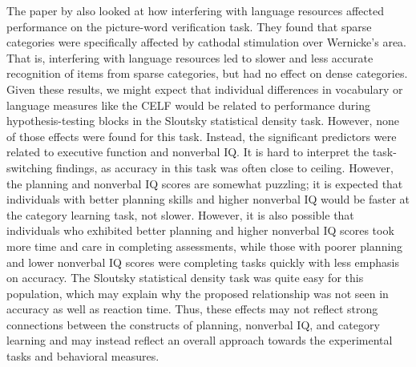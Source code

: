 \documentclass[../dissertation.tex]{subfiles}
\begin{document}
	The paper by \citet{Perry2016} also looked at how interfering with language resources affected performance on the picture-word verification task. They found that sparse categories were specifically affected by cathodal stimulation over Wernicke's area. That is, interfering with language resources led to slower and less accurate recognition of items from sparse categories, but had no effect on dense categories. Given these results, we might expect that individual differences in vocabulary or language measures like the CELF would be related to performance during hypothesis-testing blocks in the Sloutsky statistical density task. However, none of those effects were found for this task. Instead, the significant predictors were related to executive function and nonverbal IQ. It is hard to interpret the task-switching findings, as accuracy in this task was often close to ceiling. However, the planning and nonverbal IQ scores are somewhat puzzling; it is expected that individuals with better planning skills and higher nonverbal IQ would be faster at the category learning task, not slower. However, it is also possible that individuals who exhibited better planning and higher nonverbal IQ scores took more time and care in completing assessments, while those with poorer planning and lower nonverbal IQ scores were completing tasks quickly with less emphasis on accuracy. The Sloutsky statistical density task was quite easy for this population, which may explain why the proposed relationship was not seen in accuracy as well as reaction time. Thus, these effects may not reflect strong connections between the constructs of planning, nonverbal IQ, and category learning and may instead reflect an overall approach towards the experimental tasks and behavioral measures. \par
	
\end{document}
